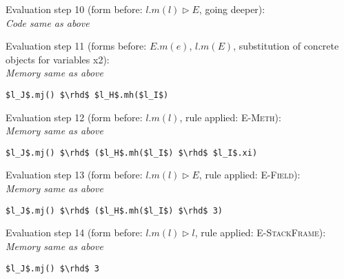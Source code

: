 \documentclass{llncs}
\begin{document}
\vspace{12pt}
\noindent Evaluation step 10 (form before: $l.m(l) \rhd E$, going deeper):\\
\textit{Code same as above}

\vspace{12pt}
\noindent Evaluation step 11 (forms before: $E.m(e)$, $l.m(E)$, substitution of concrete objects for variables x2):\\
\vspace{-6pt}
\indent\textit{Memory same as above}\\
\vspace{-6pt}
\begin{lstlisting}[xleftmargin=20pt]
$l_J$.mj() $\rhd$ $l_H$.mh($l_I$)
\end{lstlisting}

\vspace{12pt}
\noindent Evaluation step 12 (form before: $l.m(l)$, rule applied: \textsc{E-Meth}):\\
\vspace{-6pt}
\indent\textit{Memory same as above}\\
\vspace{-6pt}
\begin{lstlisting}[xleftmargin=20pt]
$l_J$.mj() $\rhd$ ($l_H$.mh($l_I$) $\rhd$ $l_I$.xi)
\end{lstlisting}

\vspace{12pt}
\noindent Evaluation step 13 (form before: $l.m(l) \rhd E$, rule applied: \textsc{E-Field}):\\
\vspace{-6pt}
\indent\textit{Memory same as above}\\
\vspace{-6pt}
\begin{lstlisting}[xleftmargin=20pt]
$l_J$.mj() $\rhd$ ($l_H$.mh($l_I$) $\rhd$ 3)
\end{lstlisting}

\vspace{12pt}
\noindent Evaluation step 14 (form before: $l.m(l) \rhd l$, rule applied: \textsc{E-StackFrame}):\\
\vspace{-6pt}
\indent\textit{Memory same as above}\\
\vspace{-6pt}
\begin{lstlisting}[xleftmargin=20pt]
$l_J$.mj() $\rhd$ 3
\end{lstlisting}
\end{document}
